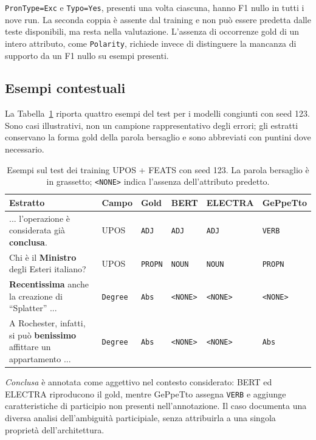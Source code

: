 \documentclass[12pt,a4paper]{report}
\begin{document}
\texttt{PronType=Exc} e \texttt{Typo=Yes}, presenti una volta ciascuna, hanno F1 nullo in tutti i nove run. La seconda coppia è assente dal training e non può essere predetta dalle teste disponibili, ma resta nella valutazione. L'assenza di occorrenze gold di un intero attributo, come \texttt{Polarity}, richiede invece di distinguere la mancanza di supporto da un F1 nullo su esempi presenti.

\subsection{Esempi contestuali}
\label{sec:contextual-examples}
La Tabella~\ref{tab:contextual-errors} riporta quattro esempi del test per i modelli congiunti con seed 123. Sono casi illustrativi, non un campione rappresentativo degli errori; gli estratti conservano la forma gold della parola bersaglio e sono abbreviati con puntini dove necessario.

\begin{table}[H]
\centering\small
\setlength{\tabcolsep}{4pt}
\renewcommand{\arraystretch}{1.05}
\begin{tabularx}{\textwidth}{>{\raggedright\arraybackslash}Xlllll}
\toprule
Estratto & Campo & Gold & BERT & ELECTRA & GePpeTto\\
\midrule
... l'operazione è considerata già \textbf{conclusa}. & UPOS & \texttt{ADJ} & \texttt{ADJ} & \texttt{ADJ} & \texttt{VERB}\\
\addlinespace[3pt]
Chi è il \textbf{Ministro} degli Esteri italiano? & UPOS & \texttt{PROPN} & \texttt{NOUN} & \texttt{NOUN} & \texttt{PROPN}\\
\addlinespace[3pt]
\textbf{Recentissima} anche la creazione di ``Splatter'' ... & \texttt{Degree} & \texttt{Abs} & \texttt{<NONE>} & \texttt{<NONE>} & \texttt{<NONE>}\\
\addlinespace[3pt]
A Rochester, infatti, si può \textbf{benissimo} affittare un appartamento ... & \texttt{Degree} & \texttt{Abs} & \texttt{<NONE>} & \texttt{<NONE>} & \texttt{Abs}\\
\bottomrule
\end{tabularx}
\caption{Esempi sul test dei training UPOS + FEATS con seed 123. La parola bersaglio è in grassetto; \texttt{<NONE>} indica l'assenza dell'attributo predetto.}
\label{tab:contextual-errors}
\end{table}

\emph{Conclusa} è annotata come aggettivo nel contesto considerato: BERT ed ELECTRA riproducono il gold, mentre GePpeTto assegna \texttt{VERB} e aggiunge caratteristiche di participio non presenti nell'annotazione. Il caso documenta una diversa analisi dell'ambiguità participiale, senza attribuirla a una singola proprietà dell'architettura.
\end{document}
